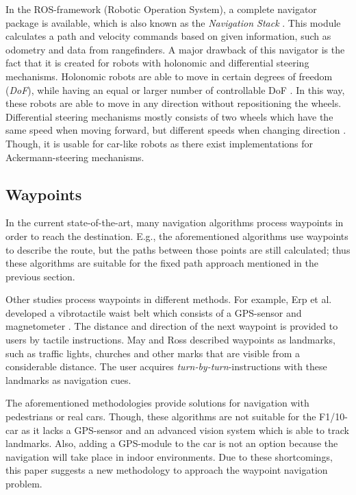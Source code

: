 \documentclass[conference,a4paper]{IEEEtran}
\begin{document}
In the ROS-framework (Robotic Operation System), a complete navigator package is available, which is also known as the \emph{Navigation Stack} \cite{Marder-Eppstein2016}\cite{Marder-Eppstein2017}. This module calculates a path and velocity commands based on given information, such as odometry and data from rangefinders. A major drawback of this navigator is the fact that it is created for robots with holonomic and differential steering mechanisms. Holonomic robots are able to move in certain degrees of freedom (\emph{DoF}), while having an equal or larger number of controllable DoF \cite{Mariappan2009}. In this way, these robots are able to move in any direction without repositioning the wheels. Differential steering mechanisms mostly consists of two wheels which have the same speed when moving forward, but different speeds when changing direction \cite{Saidonr2011}. 
Though, it is usable for car-like robots as there exist implementations for Ackermann-steering mechanisms.

\subsection{Waypoints}
In the current state-of-the-art, many navigation algorithms process waypoints in order to reach the destination. E.g., the aforementioned algorithms \cite{Henson2008}\cite{Theodosis2014} use waypoints to describe the route, but the paths between those points are still calculated; thus these algorithms are suitable for the fixed path approach mentioned in the previous section.

Other studies process waypoints in different methods. For example, Erp et al. developed a vibrotactile waist belt which consists of a GPS-sensor and magnetometer \cite{Erp2005}. The distance and direction of the next waypoint is provided to users by tactile instructions. May and Ross \cite{May2006} described waypoints as landmarks, such as traffic lights, churches and other marks that are visible from a considerable distance. The user acquires \emph{turn-by-turn}-instructions with these landmarks as navigation cues.

The aforementioned methodologies provide solutions for navigation with pedestrians or real cars. Though, these algorithms are not suitable for the F1/10-car as it lacks a GPS-sensor and an advanced vision system which is able to track landmarks. Also, adding a GPS-module to the car is not an option because the navigation will take place in indoor environments. Due to these shortcomings, this paper suggests a new methodology to approach the waypoint navigation problem. 
\end{document}

